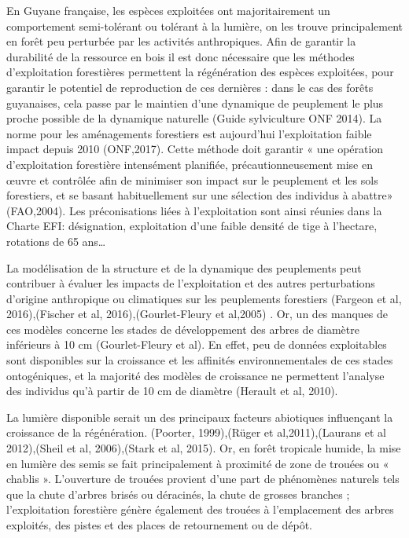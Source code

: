 \documentclass[
  12pt,
  american,
  a4paper,
  extrafontsizes,onecolumn,openright
  ]{memoir}
\begin{document}
En Guyane française, les espèces exploitées ont majoritairement un comportement semi-tolérant ou tolérant à la lumière, on les trouve principalement en forêt peu perturbée par les activités anthropiques. Afin de garantir la durabilité de la ressource en bois il est donc nécessaire que les méthodes d'exploitation forestières permettent la régénération des espèces exploitées, pour garantir le potentiel de reproduction de ces dernières : dans le cas des forêts guyanaises, cela passe par le maintien d'une dynamique de peuplement le plus proche possible de la dynamique naturelle (Guide sylviculture ONF 2014). La norme pour les aménagements forestiers est aujourd'hui l'exploitation faible impact depuis 2010 (ONF,2017). Cette méthode doit garantir « une opération d'exploitation forestière intensément planifiée, précautionneusement mise en œuvre et contrôlée afin de minimiser son impact sur le peuplement et les sols forestiers, et se basant habituellement sur une sélection des individus à abattre» (FAO,2004). Les préconisations liées à l'exploitation sont ainsi réunies dans la Charte EFI: désignation, exploitation d'une faible densité de tige à l'hectare, rotations de 65 ans\ldots{}

La modélisation de la structure et de la dynamique des peuplements peut contribuer à évaluer les impacts de l'exploitation et des autres perturbations d'origine anthropique ou climatiques sur les peuplements forestiers (Fargeon et al, 2016),(Fischer et al, 2016),(Gourlet-Fleury et al,2005) . Or, un des manques de ces modèles concerne les stades de développement des arbres de diamètre inférieurs à 10 cm (Gourlet-Fleury et al). En effet, peu de données exploitables sont disponibles sur la croissance et les affinités environnementales de ces stades ontogéniques, et la majorité des modèles de croissance ne permettent l'analyse des individus qu'à partir de 10 cm de diamètre (Herault et al, 2010).

La lumière disponible serait un des principaux facteurs abiotiques influençant la croissance de la régénération. (Poorter, 1999),(Rüger et al,2011),(Laurans et al 2012),(Sheil et al, 2006),(Stark et al, 2015). Or, en forêt tropicale humide, la mise en lumière des semis se fait principalement à proximité de zone de trouées ou « chablis ». L'ouverture de trouées provient d'une part de phénomènes naturels tels que la chute d'arbres brisés ou déracinés, la chute de grosses branches ; l'exploitation forestière génère également des trouées à l'emplacement des arbres exploités, des pistes et des places de retournement ou de dépôt.
\end{document}
